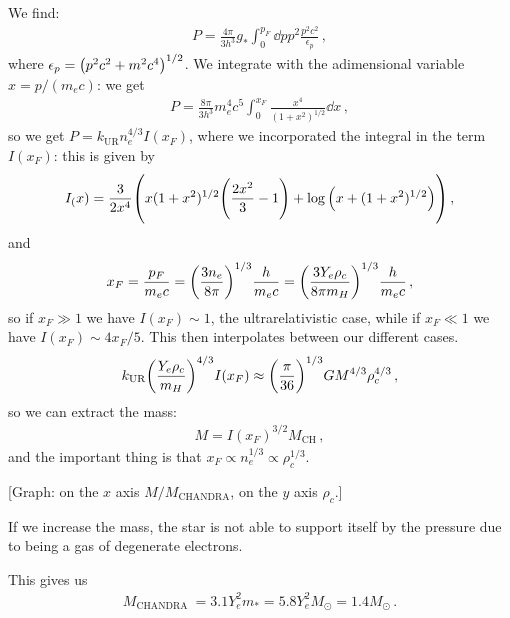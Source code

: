 \documentclass[main.tex]{subfiles}
\begin{document}
We find: 
%
\begin{align}
P = \frac{4 \pi }{3 h^3} g_{*} \int_{0}^{p_F} \dd{p} p^2 \frac{p^2 c^2}{\epsilon_{p}}
\,,
\end{align}
%
where \(\epsilon_{p} = \qty(p^2c^2 + m^2c^{4})^{1/2}\). We integrate with the adimensional variable \(x = p / (m_e c)\): we get 
%
\begin{align}
P = \frac{8 \pi }{3 h^3} m_e^4 c^{5} \int_{0}^{x_F} \frac{x^{4}}{(1+x^2)^{1/2}} \dd{x}
\,,
\end{align}
%
so we get \(P = k _{\text{UR}} n_e^{4/3}I(x_F)\), where we incorporated the integral in the term \(I(x_F)\): this is given by 
%
\begin{align}
I_(x) = \frac{3}{2 x^{4}} \qty( x (1+x^2)^{1/2} \qty(\frac{2x^2}{3} -1) + \log \qty(x + (1+x^2)^{1/2}))
\,,
\end{align}
%
and 
%
\begin{align}
x_F = \frac{p_F}{m_ec} = 
\qty(\frac{3 n_e}{8 \pi })^{1/3} \frac{h}{m_e c} =
\qty(\frac{3 Y_e \rho_{c}}{8 \pi m_H})^{1/3} \frac{h}{m_e c}
\,,
\end{align}
%
so if \(x_F \gg 1\) we have \(I(x_F) \sim 1\), the ultrarelativistic case, while if \(x_F \ll 1\) we have \(I(x_F) \sim 4 x_F / 5\). 
This then interpolates between our different cases.  
%
\begin{align}
k _{\text{UR}} \qty(\frac{Y_e \rho_{c}}{m_H})^{4/3} I(x_F)
\approx \qty(\frac{\pi }{36})^{1/3} G M^{4/3} \rho_{c}^{4/3}
\,,
\end{align}
%
so we can extract the mass: 
%
\begin{align}
M = I(x_F)^{3/2} M _{\text{CH}}
\,,
\end{align}
%
and the important thing is that \(x_F \propto n_e^{1/3} \propto \rho_{c}^{1/3}\). 

[Graph: on the \(x\) axis \(M/ M _{\text{CHANDRA}}\), on the \(y \) axis \(\rho_{c}\).]

If we increase the mass, the star is not able to support itself by the pressure due to being a gas of degenerate electrons. 

This gives us 
%
\begin{align}
M _{\text{CHANDRA }} = 3.1 Y_e^2 m_{*}
= 5.8 Y_e^2 M_{\odot} = 1.4 M_{\odot}
\,.
\end{align}
\end{document}
